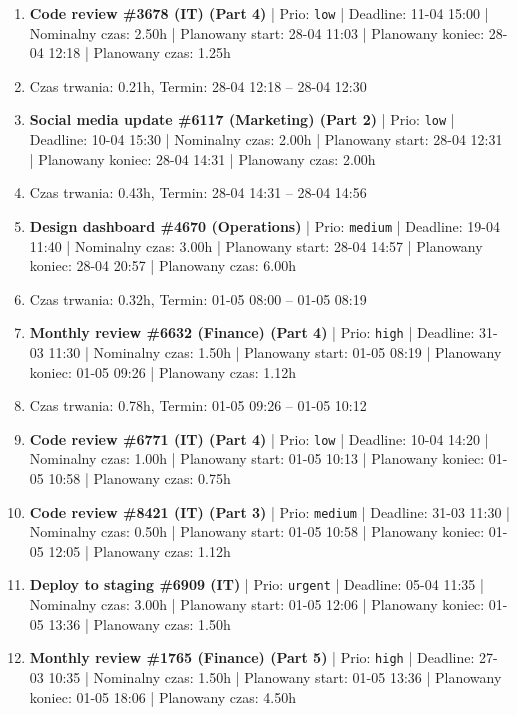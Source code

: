 {\begin{enumerate}
  \item [\textbf{14699}] \textbf{Code review \#3678 (IT) (Part 4)} | Prio: \texttt{low} | Deadline: 11-04 15:00 | Nominalny czas: 2.50h | Planowany start: 28-04 11:03 | Planowany koniec: 28-04 12:18 | Planowany czas: 1.25h
  \item [\textbf{PRZERWA}] Czas trwania: 0.21h, Termin: 28-04 12:18 -- 28-04 12:30
  \item [\textbf{14700}] \textbf{Social media update \#6117 (Marketing) (Part 2)} | Prio: \texttt{low} | Deadline: 10-04 15:30 | Nominalny czas: 2.00h | Planowany start: 28-04 12:31 | Planowany koniec: 28-04 14:31 | Planowany czas: 2.00h
  \item [\textbf{PRZERWA}] Czas trwania: 0.43h, Termin: 28-04 14:31 -- 28-04 14:56
  \item [\textbf{14676}] \textbf{Design dashboard \#4670 (Operations)} | Prio: \texttt{medium} | Deadline: 19-04 11:40 | Nominalny czas: 3.00h | Planowany start: 28-04 14:57 | Planowany koniec: 28-04 20:57 | Planowany czas: 6.00h
  \item [\textbf{PRZERWA}] Czas trwania: 0.32h, Termin: 01-05 08:00 -- 01-05 08:19
  \item [\textbf{14615}] \textbf{Monthly review \#6632 (Finance) (Part 4)} | Prio: \texttt{high} | Deadline: 31-03 11:30 | Nominalny czas: 1.50h | Planowany start: 01-05 08:19 | Planowany koniec: 01-05 09:26 | Planowany czas: 1.12h
  \item [\textbf{PRZERWA}] Czas trwania: 0.78h, Termin: 01-05 09:26 -- 01-05 10:12
  \item [\textbf{14681}] \textbf{Code review \#6771 (IT) (Part 4)} | Prio: \texttt{low} | Deadline: 10-04 14:20 | Nominalny czas: 1.00h | Planowany start: 01-05 10:13 | Planowany koniec: 01-05 10:58 | Planowany czas: 0.75h
  \item [\textbf{14665}] \textbf{Code review \#8421 (IT) (Part 3)} | Prio: \texttt{medium} | Deadline: 31-03 11:30 | Nominalny czas: 0.50h | Planowany start: 01-05 10:58 | Planowany koniec: 01-05 12:05 | Planowany czas: 1.12h
  \item [\textbf{14597}] \textbf{Deploy to staging \#6909 (IT)} | Prio: \texttt{urgent} | Deadline: 05-04 11:35 | Nominalny czas: 3.00h | Planowany start: 01-05 12:06 | Planowany koniec: 01-05 13:36 | Planowany czas: 1.50h
  \item [\textbf{14627}] \textbf{Monthly review \#1765 (Finance) (Part 5)} | Prio: \texttt{high} | Deadline: 27-03 10:35 | Nominalny czas: 1.50h | Planowany start: 01-05 13:36 | Planowany koniec: 01-05 18:06 | Planowany czas: 4.50h

\end{enumerate}}
